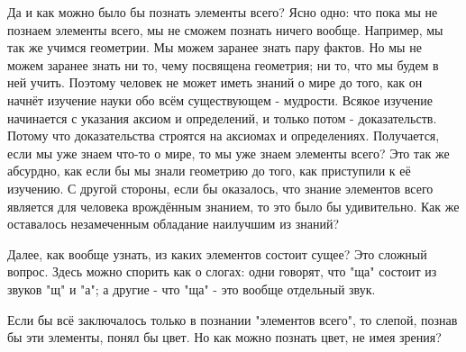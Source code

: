 \documentclass{article}
\begin{document}
Да и как можно было бы познать элементы всего? Ясно одно: что пока мы не познаем элементы всего, мы не сможем познать ничего вообще. Например, мы так же учимся геометрии. Мы можем заранее знать пару фактов. Но мы не можем заранее знать ни то, чему посвящена геометрия; ни то, что мы будем в ней учить. Поэтому человек не может иметь знаний о мире до того, как он начнёт изучение науки обо всём существующем - мудрости. Всякое изучение начинается с указания аксиом и определений, и только потом - доказательств. Потому что доказательства строятся на аксиомах и определениях. Получается, если мы уже знаем что-то о мире, то мы уже знаем элементы всего? Это так же абсурдно, как если бы мы знали геометрию до того, как приступили к её изучению. С другой стороны, если бы оказалось, что знание элементов всего является для человека врождённым знанием, то это было бы удивительно. Как же оставалось незамеченным обладание наилучшим из знаний?

Далее, как вообще узнать, из каких элементов состоит сущее? Это сложный вопрос. Здесь можно спорить как о слогах: одни говорят, что "ща" состоит из звуков "щ" и "а"; а другие - что "ща" - это вообще отдельный звук.

Если бы всё заключалось только в познании "элементов всего", то слепой, познав бы эти элементы, понял бы цвет. Но как можно познать цвет, не имея зрения?
\end{document}
